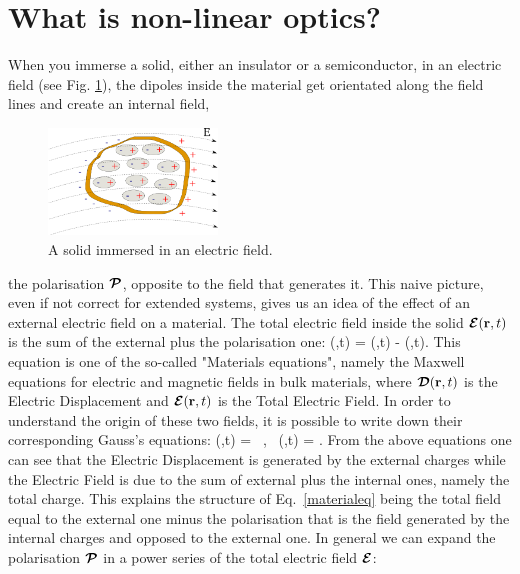 \section{What is non-linear optics?}
When you immerse a solid, either an insulator or a semiconductor, in an electric field (see Fig. \ref{immerse}), the dipoles inside the material get orientated along the field lines and create an internal field, 
\begin{figure}
    \vspace{-0.7cm}
  \begin{center}
    \includegraphics[width=0.4\textwidth]{Figures/immerse}
  \end{center}
  \caption{A solid immersed in an electric field. \label{immerse}}
\end{figure}
the polarisation ${\boldsymbol {\cal P}}$, opposite to the field that generates it. This naive picture, even if not correct for extended systems, gives us an idea of the effect of an external electric field on a material.
The total electric field inside the solid ${\boldsymbol {\cal E}}({\bf r},t)$ is the sum of the external plus the polarisation one:
\be
\EEc(\rr,t) = \DDc(\rr,t) - \PPc(\rr,t).
\label{materialeq}
\ee
This equation is one of the so-called  "Materials equations", namely the Maxwell equations for electric and magnetic fields in bulk materials, where ${\boldsymbol {\cal D}}({\bf r},t)$ is the Electric Displacement and $ {\boldsymbol {\cal E}}({\bf r},t)$ is the Total Electric Field. In order to understand the origin of these two fields, it is possible to write down their corresponding Gauss's equations:
\ben
\nabla \DDc(\rr,t)  =  \mbox{ , } \nabla \EEc(\rr,t)  = . 
\een
From the above equations one can see that the Electric Displacement is generated by the external charges while the Electric Field is due to the sum of external plus the internal ones, namely the total charge. This explains the structure of Eq.~\ref{materialeq} being the total field equal to the external one minus the polarisation that is the field generated by the internal charges and  opposed to the external one. In general we can expand the polarisation  ${\boldsymbol {\cal P}}$ in a power series of the total electric field ${\boldsymbol {\cal E}}$: 
